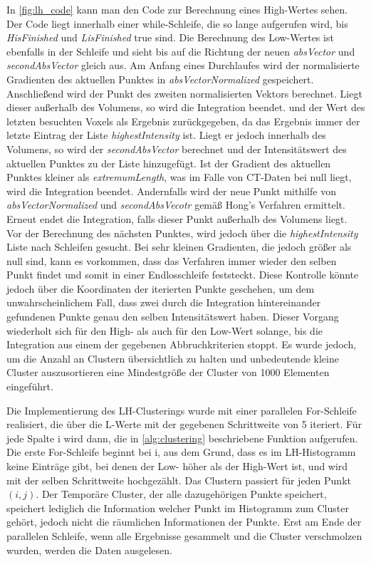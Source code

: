 In \autoref{fig:lh_code} kann man den Code zur Berechnung eines High-Wertes sehen. Der Code liegt innerhalb einer while-Schleife, die so lange aufgerufen wird, bis \textit{HisFinished} und \textit{LisFinished} true sind. Die Berechnung des Low-Wertes ist ebenfalls in der Schleife und sieht bis auf die Richtung der neuen \textit{absVector} und \textit{secondAbsVector} gleich aus.
\newline
Am Anfang eines Durchlaufes wird der normalisierte Gradienten des aktuellen Punktes in \textit{absVectorNormalized} gespeichert. Anschließend wird der Punkt des zweiten normalisierten Vektors berechnet. Liegt dieser außerhalb des Volumens, so wird die Integration beendet. und der Wert des letzten besuchten Voxels als Ergebnis zurückgegeben, da das Ergebnis immer der letzte Eintrag der Liste \textit{highestIntensity} ist. Liegt er jedoch innerhalb des Volumens, so wird der \textit{secondAbsVector} berechnet und der Intensitätswert des aktuellen Punktes zu der Liste hinzugefügt. Ist der Gradient des aktuellen Punktes kleiner als \textit{extremumLength}, was im Falle von CT-Daten bei null liegt, wird die Integration beendet. Andernfalls wird der neue Punkt mithilfe von \textit{absVectorNormalized} und \textit{secondAbsVecotr} gemäß Hong's Verfahren \cite{hong2003method} ermittelt. Erneut endet die Integration, falls dieser Punkt außerhalb des Volumens liegt. Vor der Berechnung des nächsten Punktes, wird jedoch über die \textit{highestIntensity} Liste nach Schleifen gesucht. Bei sehr kleinen Gradienten, die jedoch größer als null sind, kann es vorkommen, dass das Verfahren immer wieder den selben Punkt findet und somit in einer Endlosschleife feststeckt. Diese Kontrolle könnte jedoch über die Koordinaten der iterierten Punkte geschehen, um dem unwahrscheinlichem Fall, dass zwei durch die Integration hintereinander gefundenen Punkte genau den selben Intensitätswert haben.
\newline
Dieser Vorgang wiederholt sich für den High- als auch für den Low-Wert solange, bis die Integration aus einem der gegebenen Abbruchkriterien stoppt. Es wurde jedoch, um die Anzahl an Clustern übersichtlich zu halten und unbedeutende kleine Cluster auszusortieren eine Mindestgröße der Cluster von 1000 Elementen eingeführt.



Die Implementierung des LH-Clusterings wurde mit einer parallelen For-Schleife realisiert, die über die L-Werte mit der gegebenen Schrittweite von 5 iteriert. Für jede Spalte i wird dann, die in \autoref{alg:clustering} beschriebene Funktion aufgerufen. Die erste For-Schleife beginnt bei i, aus dem Grund, dass es im LH-Histogramm keine Einträge gibt, bei denen der Low- höher als der High-Wert ist, und wird mit der selben Schrittweite hochgezählt. Das Clustern passiert für jeden Punkt $(i, j)$. Der Temporäre Cluster, der alle dazugehörigen Punkte speichert, speichert lediglich die Information welcher Punkt im Histogramm zum Cluster gehört, jedoch nicht die räumlichen Informationen der Punkte. Erst am Ende der parallelen Schleife, wenn alle Ergebnisse gesammelt und die Cluster verschmolzen wurden, werden die Daten ausgelesen.

